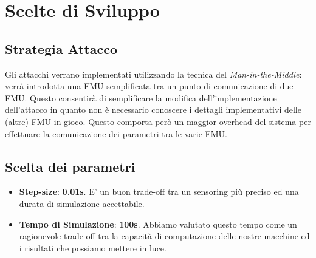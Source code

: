 \section{Scelte di Sviluppo}
\subsection{Strategia Attacco}
Gli attacchi verrano implementati utilizzando la tecnica del \textit{Man-in-the-Middle}: verrà introdotta una FMU semplificata tra un punto di comunicazione di due FMU. Questo consentirà di semplificare la modifica dell'implementazione dell'attacco in quanto non è necessario conoscere i dettagli implementativi delle (altre) FMU in gioco. Questo comporta però un maggior overhead del sistema per effettuare la comunicazione dei parametri tra le varie FMU.
\subsection{Scelta dei parametri}

\begin{itemize}
	\item \textbf{Step-size}: \textbf{0.01s}. E' un buon trade-off tra un sensoring più preciso ed una durata di simulazione accettabile.
	\item \textbf{Tempo di Simulazione}: \textbf{100s}. Abbiamo valutato questo tempo come un ragionevole trade-off tra la capacità di computazione delle nostre macchine ed i risultati che possiamo mettere in luce. 
\end{itemize}